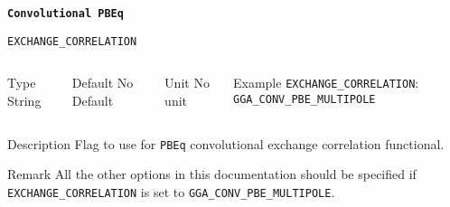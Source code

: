
\begin{frame}[allowframebreaks,c]{} \label{PBEq}

	\begin{center}
	\Huge \textbf{\texttt{Convolutional PBEq}}
	\end{center}
	
	\end{frame}
	
	\begin{frame}[allowframebreaks]{\texttt{EXCHANGE\_CORRELATION}} \label{EXCHANGE_CORRELATION}
	\vspace*{-12pt}
	\begin{columns}
	\begin{block}{Type}
	String
	\end{block}
	
	\begin{block}{Default}
	No Default
	\end{block}
	
	\begin{block}{Unit}
	No unit
	\end{block}
	
	\begin{block}{Example}
	\texttt{EXCHANGE\_CORRELATION}: \texttt{GGA\_CONV\_PBE\_MULTIPOLE}
	\end{block}
	\end{columns}
	
	\begin{block}{Description}
	Flag to use for \texttt{PBEq} convolutional exchange correlation functional.
	\end{block}
	
	\begin{block}{Remark}
	All the other options in this documentation should be specified if \texttt{EXCHANGE\_CORRELATION} is set to \texttt{GGA\_CONV\_PBE\_MULTIPOLE}. 
	\end{block}
	
	\end{frame}
	
